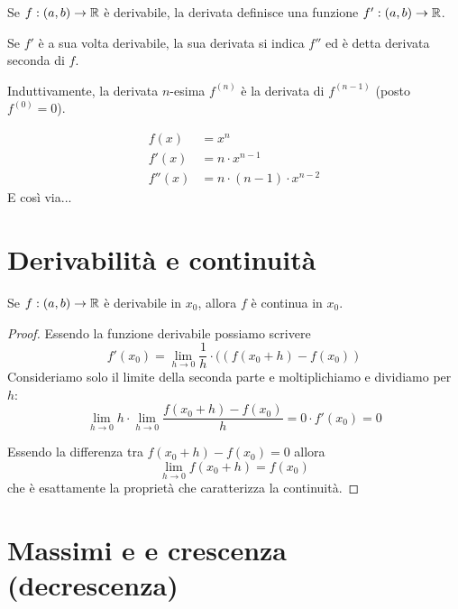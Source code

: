 \begin{definition}
Se $f: (a, b) \to \mathbb R$ è derivabile, la derivata definisce una funzione $f': (a, b) \to \mathbb R$.
\end{definition}

Se $f'$ è a sua volta derivabile, la sua derivata si indica $f''$ ed è detta derivata seconda di $f$. 

Induttivamente, la derivata $n$-esima $f^{(n)}$ è la derivata di $f^{(n-1)}$ (posto $f^{(0)} = 0$).

\begin{example}
\begin{align*}
f(x) &= x^n \\
f'(x) &= n \cdot x^{n-1} \\
f''(x) &= n \cdot (n-1) \cdot x^{n-2} 
\end{align*}
E così via...
\end{example}

\section{Derivabilità e continuità}

\begin{proposition}
Se $f : (a, b) \to \mathbb R$ è derivabile in $x_0$, allora $f$ è continua in $x_0$.
\end{proposition}

\begin{proof}
Essendo la funzione derivabile possiamo scrivere
\begin{equation*}
f'(x_0) = \lim_{h \to 0} \frac{1}{h} \cdot ((f(x_0+h)-f(x_0))
\end{equation*}
Consideriamo solo il limite della seconda parte e moltiplichiamo e dividiamo per $h$:
\begin{equation*}
\lim_{h \to 0} h \cdot \lim_{h \to 0} \frac{f(x_0+h)-f(x_0)}{h} = 0 \cdot f'(x_0) = 0
\end{equation*}

Essendo la differenza tra $f(x_0+h) - f(x_0) = 0$ allora
\begin{equation*}
\lim_{h \to 0} f(x_0+h) = f(x_0)
\end{equation*}
che è esattamente la proprietà che caratterizza la continuità.
\end{proof}

\section{Massimi e e crescenza (decrescenza)}

